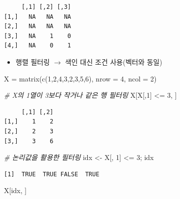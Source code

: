 \documentclass[
  11pt,
]{krantz}
\newenvironment{Shaded}{\begin{snugshade}}{\end{snugshade}}
\newcommand{\AttributeTok}[1]{\textcolor[rgb]{0.61,0.61,0.61}{#1}}
\newcommand{\CommentTok}[1]{\textcolor[rgb]{0.37,0.37,0.37}{\textit{#1}}}
\newcommand{\DecValTok}[1]{\textcolor[rgb]{0.06,0.06,0.06}{#1}}
\newcommand{\FunctionTok}[1]{\textcolor[rgb]{0,0,0}{#1}}
\newcommand{\NormalTok}[1]{#1}
\newcommand{\OtherTok}[1]{\textcolor[rgb]{0.37,0.37,0.37}{#1}}
\newcommand{\SpecialCharTok}[1]{\textcolor[rgb]{0,0,0}{#1}}
\providecommand{\tightlist}{%
  \setlength{\itemsep}{0pt}\setlength{\parskip}{0pt}}
\begin{document}
\begin{verbatim}
     [,1] [,2] [,3]
[1,]   NA   NA   NA
[2,]   NA   NA   NA
[3,]   NA    1    0
[4,]   NA    0    1
\end{verbatim}

\normalsize

\begin{itemize}
\tightlist
\item
  행렬 필터링 \(\rightarrow\) 색인 대신 조건 사용(벡터와 동일)
\end{itemize}

\footnotesize

\begin{Shaded}
\begin{Highlighting}[]
\NormalTok{X }\OtherTok{=} \FunctionTok{matrix}\NormalTok{(}\FunctionTok{c}\NormalTok{(}\DecValTok{1}\NormalTok{,}\DecValTok{2}\NormalTok{,}\DecValTok{4}\NormalTok{,}\DecValTok{3}\NormalTok{,}\DecValTok{2}\NormalTok{,}\DecValTok{3}\NormalTok{,}\DecValTok{5}\NormalTok{,}\DecValTok{6}\NormalTok{), }\AttributeTok{nrow =} \DecValTok{4}\NormalTok{, }\AttributeTok{ncol =} \DecValTok{2}\NormalTok{)}

\CommentTok{\# X의 1열이 3보다 작거나 같은 행 필터링}
\NormalTok{X[X[,}\DecValTok{1}\NormalTok{] }\SpecialCharTok{\textless{}=} \DecValTok{3}\NormalTok{, ]}
\end{Highlighting}
\end{Shaded}

\begin{verbatim}
     [,1] [,2]
[1,]    1    2
[2,]    2    3
[3,]    3    6
\end{verbatim}

\begin{Shaded}
\begin{Highlighting}[]
\CommentTok{\# 논리값을 활용한 필터링}
\NormalTok{idx }\OtherTok{\textless{}{-}}\NormalTok{ X[, }\DecValTok{1}\NormalTok{] }\SpecialCharTok{\textless{}=} \DecValTok{3}\NormalTok{; idx}
\end{Highlighting}
\end{Shaded}

\begin{verbatim}
[1]  TRUE  TRUE FALSE  TRUE
\end{verbatim}

\begin{Shaded}
\begin{Highlighting}[]
\NormalTok{X[idx, ]}
\end{Highlighting}
\end{Shaded}
\end{document}
